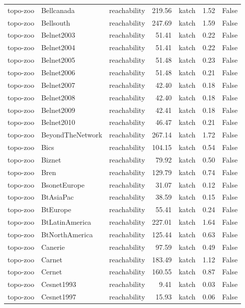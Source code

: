 \begin{tabular}{lllrlrr}
topo-zoo & Bellcanada & reachability & 219.56 & katch & 1.52 & False \\
topo-zoo & Bellsouth & reachability & 247.69 & katch & 1.59 & False \\
topo-zoo & Belnet2003 & reachability & 51.41 & katch & 0.22 & False \\
topo-zoo & Belnet2004 & reachability & 51.41 & katch & 0.22 & False \\
topo-zoo & Belnet2005 & reachability & 51.48 & katch & 0.23 & False \\
topo-zoo & Belnet2006 & reachability & 51.48 & katch & 0.21 & False \\
topo-zoo & Belnet2007 & reachability & 42.40 & katch & 0.18 & False \\
topo-zoo & Belnet2008 & reachability & 42.40 & katch & 0.18 & False \\
topo-zoo & Belnet2009 & reachability & 42.41 & katch & 0.18 & False \\
topo-zoo & Belnet2010 & reachability & 46.47 & katch & 0.21 & False \\
topo-zoo & BeyondTheNetwork & reachability & 267.14 & katch & 1.72 & False \\
topo-zoo & Bics & reachability & 104.15 & katch & 0.54 & False \\
topo-zoo & Biznet & reachability & 79.92 & katch & 0.50 & False \\
topo-zoo & Bren & reachability & 129.79 & katch & 0.74 & False \\
topo-zoo & BsonetEurope & reachability & 31.07 & katch & 0.12 & False \\
topo-zoo & BtAsiaPac & reachability & 38.59 & katch & 0.15 & False \\
topo-zoo & BtEurope & reachability & 55.41 & katch & 0.24 & False \\
topo-zoo & BtLatinAmerica & reachability & 227.01 & katch & 1.64 & False \\
topo-zoo & BtNorthAmerica & reachability & 125.44 & katch & 0.63 & False \\
topo-zoo & Canerie & reachability & 97.59 & katch & 0.49 & False \\
topo-zoo & Carnet & reachability & 183.49 & katch & 1.12 & False \\
topo-zoo & Cernet & reachability & 160.55 & katch & 0.87 & False \\
topo-zoo & Cesnet1993 & reachability & 9.41 & katch & 0.03 & False \\
topo-zoo & Cesnet1997 & reachability & 15.93 & katch & 0.06 & False \\

\end{tabular}
